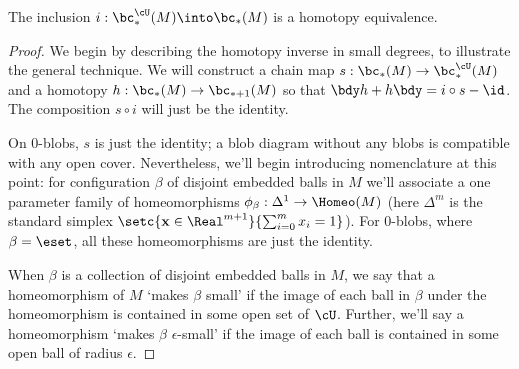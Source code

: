 \begin{thm} \label{thm:small-blobs}
The inclusion $i: \bc^{\cU}_*(M) \into \bc_*(M)$ is a homotopy equivalence.
\end{thm}
\begin{proof}
We begin by describing the homotopy inverse in small degrees, to illustrate the general technique.
We will construct a chain map $s:  \bc_*(M) \to \bc^{\cU}_*(M)$ and a homotopy $h:\bc_*(M) \to \bc_{*+1}(M)$ so that $\bdy h+h \bdy=i\circ s - \id$. The composition $s \circ i$ will just be the identity.

On $0$-blobs, $s$ is just the identity; a blob diagram without any blobs is compatible with any open cover. 
Nevertheless, we'll begin introducing nomenclature at this point: for configuration $\beta$ of disjoint embedded balls in $M$ we'll associate a one parameter family of homeomorphisms $\phi_\beta : \Delta^1 \to \Homeo(M)$ (here $\Delta^m$ is the standard simplex $\setc{\mathbf{x} \in \Real^{m+1}}{\sum_{i=0}^m x_i = 1}$). For $0$-blobs, where $\beta = \eset$, all these homeomorphisms are just the identity.

When $\beta$ is a collection of disjoint embedded balls in $M$, we say that a homeomorphism of $M$ `makes $\beta$ small' if the image of each ball in $\beta$ under the homeomorphism is contained in some open set of $\cU$. Further, we'll say a homeomorphism `makes $\beta$ $\epsilon$-small' if the image of each ball is contained in some open ball of radius $\epsilon$.


\end{proof}
